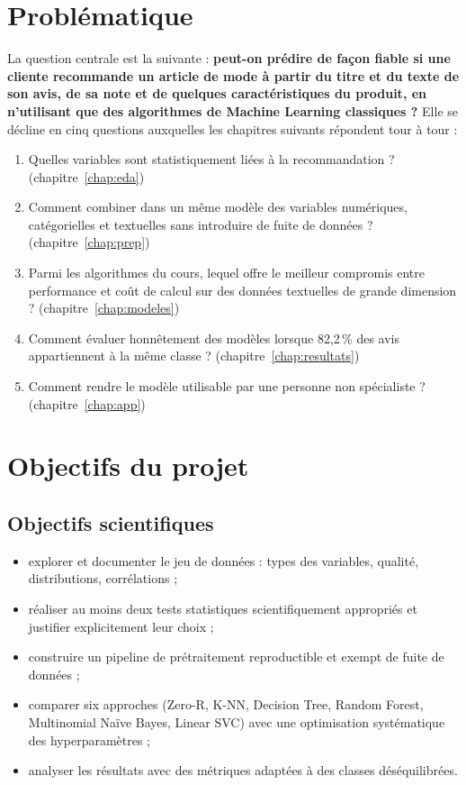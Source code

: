 \documentclass[11pt,a4paper]{report}
\numberwithin{equation}{chapter}
\begin{document}
\section{Problématique}
La question centrale est la suivante : \textbf{peut-on prédire de façon fiable si une cliente recommande un article de mode à partir du titre et du texte de son avis, de sa note et de quelques caractéristiques du produit, en n'utilisant que des algorithmes de Machine Learning classiques ?} Elle se décline en cinq questions auxquelles les chapitres suivants répondent tour à tour :
\begin{enumerate}
\item Quelles variables sont statistiquement liées à la recommandation ? (chapitre~\ref{chap:eda})
\item Comment combiner dans un même modèle des variables numériques, catégorielles et textuelles sans introduire de fuite de données ? (chapitre~\ref{chap:prep})
\item Parmi les algorithmes du cours, lequel offre le meilleur compromis entre performance et coût de calcul sur des données textuelles de grande dimension ? (chapitre~\ref{chap:modeles})
\item Comment évaluer honnêtement des modèles lorsque 82,2\,\% des avis appartiennent à la même classe ? (chapitre~\ref{chap:resultats})
\item Comment rendre le modèle utilisable par une personne non spécialiste ? (chapitre~\ref{chap:app})
\end{enumerate}

\section{Objectifs du projet}
\subsection{Objectifs scientifiques}
\begin{itemize}
\item explorer et documenter le jeu de données : types des variables, qualité, distributions, corrélations ;
\item réaliser au moins deux tests statistiques scientifiquement appropriés et justifier explicitement leur choix ;
\item construire un pipeline de prétraitement reproductible et exempt de fuite de données ;
\item comparer six approches (Zero-R, K-NN, Decision Tree, Random Forest, Multinomial Naïve Bayes, Linear SVC) avec une optimisation systématique des hyperparamètres ;
\item analyser les résultats avec des métriques adaptées à des classes déséquilibrées.
\end{itemize}
\end{document}
